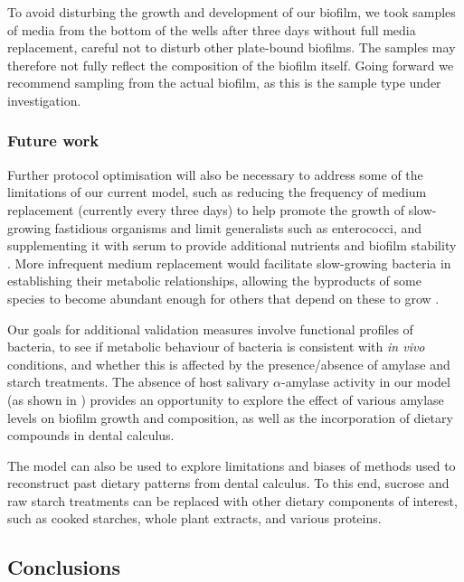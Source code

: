 \documentclass[10pt,a4paper]{article}
\begin{document}
To avoid disturbing the growth and development of our biofilm, we took
samples of media from the bottom of the wells after three days without
full media replacement, careful not to disturb other plate-bound
biofilms. The samples may therefore not fully reflect the composition of
the biofilm itself. Going forward we recommend sampling from the actual
biofilm, as this is the sample type under investigation.

\subsubsection{Future work}\label{future-work}

Further protocol optimisation will also be necessary to address some of
the limitations of our current model, such as reducing the frequency of
medium replacement (currently every three days) to help promote the
growth of slow-growing fastidious organisms and limit generalists such
as enterococci, and supplementing it with serum to provide additional
nutrients and biofilm stability
\citep{tianUsingDGGE2010, ammannZurichBiofilm2012}. More infrequent
medium replacement would facilitate slow-growing bacteria in
establishing their metabolic relationships, allowing the byproducts of
some species to become abundant enough for others that depend on these
to grow \citep{marshDentalPlaque2005}.

Our goals for additional validation measures involve functional profiles
of bacteria, to see if metabolic behaviour of bacteria is consistent
with \emph{in vivo} conditions, and whether this is affected by the
presence/absence of amylase and starch treatments. The absence of host
salivary \(\alpha\)-amylase activity in our model (as shown in
\citet{bartholdyInvestigatingBiases2022}) provides an opportunity to
explore the effect of various amylase levels on biofilm growth and
composition, as well as the incorporation of dietary compounds in dental
calculus.

The model can also be used to explore limitations and biases of methods
used to reconstruct past dietary patterns from dental calculus. To this
end, sucrose and raw starch treatments can be replaced with other
dietary components of interest, such as cooked starches, whole plant
extracts, and various proteins.

\subsection{Conclusions}\label{conclusions}
\end{document}
